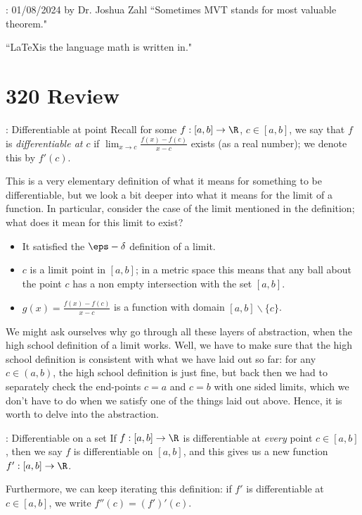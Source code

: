 \begin{nquote}{: 01/08/2024 by Dr. Joshua Zahl}
	``Sometimes MVT stands for most valuable theorem."
	
	\medskip
	
	``\LaTeX is the language math is written in."
\end{nquote}

\section*{320 Review}
\begin{ndef}{: Differentiable at point}
	Recall for some \(f:[a,b]\to\R\), \(c\in[a,b]\), we say that \(f\) is \emph{differentiable at \(c\)} if \(\displaystyle\lim_{x\to c}\frac{f(x)-f(c)}{x-c}\) exists (as a real number); we denote this by \(f'(c)\).
\end{ndef}
This is a very elementary definition of what it means for something to be differentiable, but we look a bit deeper into what it means for the limit of a function. In particular, consider the case of the limit mentioned in the definition; what does it mean for this limit to exist?
\begin{itemize}
	\item It satisfied the \(\eps-\delta\) definition of a limit.
	
	\item \(c\) is a limit point in \([a,b]\); in a metric space this means that any ball about the point \(c\) has a non empty intersection with the set \([a,b]\).
	
	\item \(g(x)=\displaystyle\frac{f(x)-f(c)}{x-c}\) is a function with domain \([a,b]\backslash\{c\}\).
\end{itemize}
We might ask ourselves why go through all these layers of abstraction, when the high school definition of a limit works. Well, we have to make sure that the high school definition is consistent with what we have laid out so far: for any \(c\in (a,b)\), the high school definition is just fine, but back then we had to separately check the end-points \(c=a\) and \(c=b\) with one sided limits, which we don't have to do when we satisfy one of the things laid out above. Hence, it is worth to delve into the abstraction.

\begin{ndef}{: Differentiable on a set}
	If \(f:[a,b]\to\R\) is differentiable at \emph{every} point \(c\in[a,b]\), then we say \(f\) is differentiable on \([a,b]\), and this gives us a new function \(f':[a,b]\to\R\).
\end{ndef}
Furthermore, we can keep iterating this definition: if \(f'\) is differentiable at \(c\in[a,b]\), we write \(f''(c)=(f')'(c)\).

